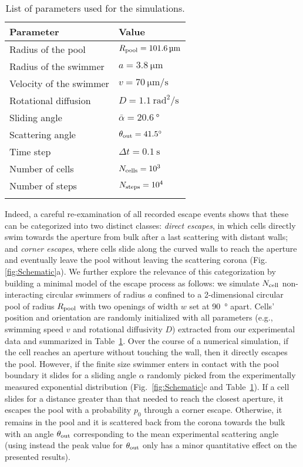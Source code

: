 \documentclass[aps,showpacs,superscriptaddress,amsfonts,twocolumn,prl]{revtex4}
\begin{document}
\begin{table}[tb]
	\caption{\label{tab:parameters}List of parameters used for the simulations.}
	\begin{tabular}{|l|l|}
		\colrule
		\textrm{Parameter}&
		\textrm{Value}\\
		\hline\hline
		Radius of the pool & $R_{\rm pool} = \SI{101.6}{\micro\meter}$\\
		Radius of the swimmer & $a = \SI{3.8}{\micro\meter}$\\
		Velocity of the swimmer & $v = \SI{70}{\micro\meter\per\second}$\\
		Rotational diffusion & $D = \SI{1.1}{\square\radian\per\second}$\\
		Sliding angle & $\bar{\alpha} = \SI{20.6}{\degree}$\\
		Scattering angle & $\theta_{\rm out} = \SI{41.5}{\degree}$\\
		\colrule
		Time step & $\Delta t = \SI{0.1}{\second}$\\
		Number of cells & $N_{\rm cells} = \num{e3}$\\
		Number of steps & $N_{\rm steps} = \num{e4}$\\
		\colrule
	\end{tabular}
\end{table}

Indeed, a careful re-examination of all recorded escape events shows that these can be categorized into two distinct classes: \textit{direct escapes}, in which cells directly swim towards the aperture from bulk after a last scattering with distant walls; and \textit{corner escapes}, where cells slide along the curved walls to reach the aperture and eventually leave the pool without leaving the scattering corona (Fig. \ref{fig:Schematic}a). We further explore the relevance of this categorization by building a minimal model of the escape process as follows: we simulate $N_{\rm cell}$ non-interacting circular swimmers of radius $a$ confined to a 2-dimensional circular pool of radius $R_{\rm pool}$ with two openings of width $w$ set at \SI{90}{\degree} apart. Cells' position and orientation are randomly initialized with all parameters (e.g., swimming speed $v$ and rotational diffusivity $D$) extracted from our experimental data and summarized in Table~\ref{tab:parameters}. Over the course of a numerical simulation, if the cell reaches an aperture without touching the wall, then it directly escapes the pool. However, if the finite size swimmer enters in contact with the pool boundary it slides for a sliding angle $\alpha$ randomly picked from the experimentally measured exponential distribution (Fig.~\ref{fig:Schematic}c and Table~\ref{tab:parameters}). If a cell slides for a distance greater than that needed to reach the closest aperture, it escapes the pool with a probability $p_0$ through a corner escape. Otherwise, it remains in the pool and it is scattered back from the corona towards the bulk with an angle $\theta_{\rm out}$ corresponding to the mean experimental scattering angle (using instead the peak value for $\theta_{\rm out}$ only has a minor quantitative effect on the presented results).
\end{document}
